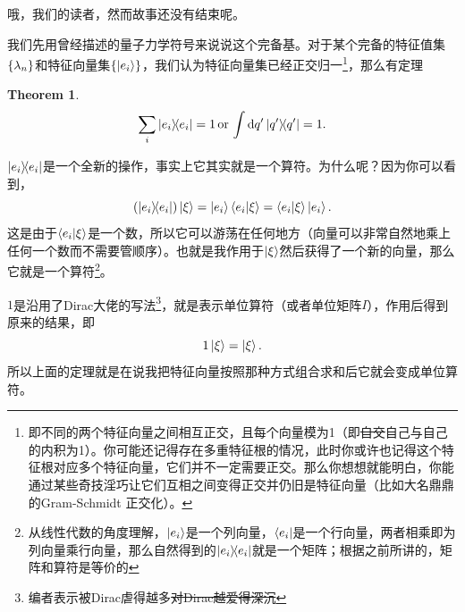 \documentclass[12pt,a4paper,openany,twoside]{book}
\newtheorem{theorem}{Theorem}[section]
\numberwithin{equation}{section}
\begin{document}
        哦，我们的读者，然而故事还没有结束呢。

        我们先用曾经描述的量子力学符号来说说这个完备基。对于某个完备的特征值集$\qty{\lambda_n}$和特征向量集$\qty{\ket{e_i}}$，我们认为特征向量集已经正交归一\footnote{即不同的两个特征向量之间相互正交，且每个向量模为1（即\sout{自交}自己与自己的内积为1）。你可能还记得存在多重特征根的情况，此时你或许也记得这个特征根对应多个特征向量，它们并不一定需要正交。那么你想想就能明白，你能通过某些奇技淫巧让它们互相之间变得正交并仍旧是特征向量（比如大名鼎鼎的Gram-Schmidt 正交化）。}，那么有定理
        \begin{theorem}
          \begin{equation}
            \sum_i{\dyad{e_i}}=1\,\text{or}\,\int{\dd{q'}\dyad{q'}}=1.
          \end{equation}
        \end{theorem}

        $\dyad{e_i}$是一个全新的操作，事实上它其实就是一个算符。为什么呢？因为你可以看到，
        \begin{equation}
          \qty(\dyad{e_i})\ket{\xi}=\ket{e_i}\bra{e_i}\ket{\xi}=\bra{e_i}\ket{\xi}\ket{e_i}.
          \label{ ket bra }
        \end{equation}
        这是由于$\bra{e_i}\ket{\xi}$是一个数，所以它可以游荡在任何地方（向量可以非常自然地乘上任何一个数而不需要管顺序）。也就是我作用于$\ket{\xi}$然后获得了一个新的向量，那么它就是一个算符\footnote{从线性代数的角度理解，$\ket{e_i}$是一个列向量，$\bra{e_i}$是一个行向量，两者相乘即为列向量乘行向量，那么自然得到的$\dyad{e_i}$就是一个矩阵；根据之前所讲的，矩阵和算符是等价的}。

        $1$是沿用了Dirac大佬的写法\footnote{编者表示被Dirac虐得越多\sout{对Dirac越爱得深沉}}，就是表示单位算符（或者单位矩阵$I$），作用后得到原来的结果，即
        \begin{equation}
          1\ket{\xi}=\ket{\xi}.
        \end{equation}
        所以上面的定理就是在说我把特征向量按照那种方式组合求和后它就会变成单位算符。
\end{document}

